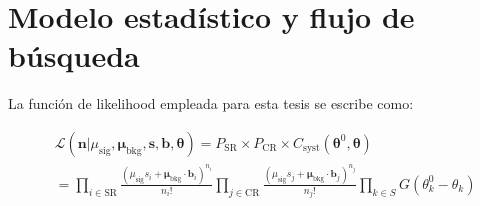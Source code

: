 

\section{Modelo estadístico y flujo de búsqueda}\label{sec:flujo_busqueda}

La función de likelihood empleada para esta tesis se escribe como:


\begin{equation}
	\begin{split}
	& \mathcal{L} (\textbf{n} | \mu_\text{sig}, \bm{\mu}_{\text{bkg}}, \textbf{s}, \textbf{b}, \bm{\theta}) = P_\text{SR} \times P_\text{CR} \times  C_\text{syst} (\bm{\theta}^0, \bm{\theta}) \\
	& = \prod_{i \in \text{SR}} \frac{(\mu_\text{sig} s_i + \bm{\mu}_{\text{bkg}} \cdot \textbf{b}_i)^{n_i}}{n_i!} \prod_{j \in \text{CR}} \frac{(\mu_\text{sig} s_j + \bm{\mu}_{\text{bkg}} \cdot \textbf{b}_j)^{n_j}}{n_j!} \prod_{k \in S} G(\theta_k^0 - \theta_k) \\
	\end{split}
	\label{eq:analysis_lh}
\end{equation}


